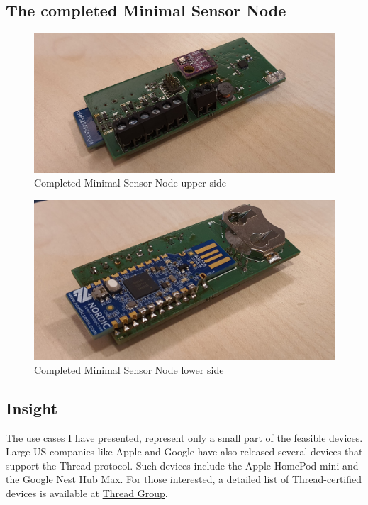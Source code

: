\subsection{The completed Minimal Sensor Node}
\begin{figure}[!htb]
    \centering
    \includegraphics[width=\textwidth]{img/minimalupperside.jpg}
    \caption{Completed Minimal Sensor Node upper side}
    \label{fig:realminimalup}
\end{figure}
\begin{figure}[!htb]
    \centering
    \includegraphics[width=\textwidth]{img/minimaldownside.jpg}
    \caption{Completed Minimal Sensor Node lower side}
    \label{fig:realminimaldown}
\end{figure}


\subsection{Insight}
The use cases I have presented, represent only a small part of the feasible devices. Large US companies like Apple and Google have also released several devices that support the Thread protocol. Such devices include the Apple HomePod mini and the Google Nest Hub Max. For those interested, a detailed list of Thread-certified devices is available at \href{https://www.threadgroup.org/What-is-Thread/Thread-Benefits}{Thread Group}\cite{devices}. 